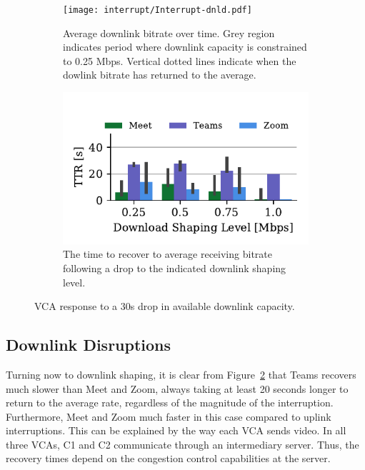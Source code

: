 \begin{figure}[t!]
 \centering
\begin{subfigure}[t]{.5\textwidth}
   \centering
    \texttt{[image: interrupt/Interrupt-dnld.pdf]}
    \caption{Average downlink bitrate over time. Grey region indicates period where downlink capacity is constrained to 0.25 Mbps. Vertical dotted lines indicate when the dowlink bitrate has returned to the average.}
    \label{fig:ts-dnld}
\end{subfigure}
\begin{subfigure}[t]{.5\textwidth}
  \centering
    \includegraphics[width=.9\textwidth,keepaspectratio]{figures/interrupt/TTR-dnld.pdf}
    \caption{The time to recover to average receiving bitrate following a drop to the indicated downlink shaping level.}
    \label{fig:TTR_dnld}
\end{subfigure}
\caption{VCA response to a 30s drop in available downlink capacity.}
\label{fig:interrupt-dnld}
\end{figure}

\subsection{Downlink Disruptions}

Turning now to downlink shaping, it is clear from Figure~\ref{fig:TTR_dnld} that Teams recovers much slower than Meet and Zoom, always taking at least 20 seconds longer to return to the average rate, regardless of the magnitude of the interruption. Furthermore, Meet and Zoom much faster in this case compared to uplink interruptions. This can be explained by the way each VCA sends video. In all three VCAs, C1 and C2 communicate through an intermediary server. Thus, the recovery times depend on the congestion control capabilities at the server. 


